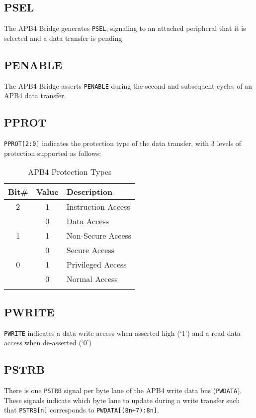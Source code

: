 \subsection{PSEL}\label{psel}

The APB4 Bridge generates \texttt{PSEL}, signaling to an attached peripheral that
it is selected and a data transfer is pending.

\subsection{PENABLE}\label{penable}

The APB4 Bridge asserts \texttt{PENABLE} during the second and
subsequent cycles of an APB4 data transfer.

\subsection{PPROT}\label{pprot}

\texttt{PPROT[2:0]} indicates the protection type of the data transfer, with
3 levels of protection supported as follows:

\begin{longtable}[]{@{}ccl@{}}
\toprule
\textbf{Bit\#} & \textbf{Value} & \textbf{Description}\tabularnewline
\midrule
\endhead
2 & 1 & Instruction Access\tabularnewline
& 0 & Data Access\tabularnewline
1 & 1 & Non-Secure Access\tabularnewline
& 0 & Secure Access\tabularnewline
0 & 1 & Privileged Access\tabularnewline
& 0 & Normal Access\tabularnewline
\bottomrule
\caption{APB4 Protection Types}
\end{longtable}

\subsection{PWRITE}\label{pwrite}

\texttt{PWRITE} indicates a data write access when asserted high (`1') and a read
data access when de-asserted (`0')

\subsection{PSTRB}\label{pstrb}

There is one \texttt{PSTRB} signal per byte lane of the APB4 write data bus
(\texttt{PWDATA}). These signals indicate which byte lane to update during a
write transfer such that \texttt{PSTRB[n]} corresponds to
\texttt{PWDATA[(8n+7):8n]}.

